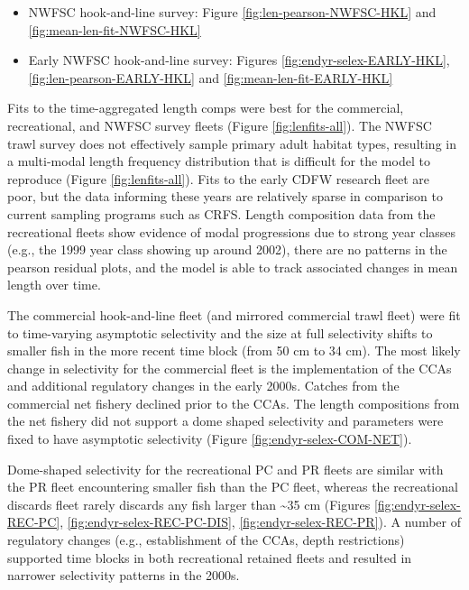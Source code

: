 \documentclass[11pt,
  english,
]{article}
\begin{document}
\begin{itemize}
  \tagmcend\tagstructend\tagstructend
\item

  NWFSC hook-and-line survey: Figure \ref{fig:len-pearson-NWFSC-HKL} and \ref{fig:mean-len-fit-NWFSC-HKL}

  \tagmcend\tagstructend\tagstructend
\item

  Early NWFSC hook-and-line survey: Figures \ref{fig:endyr-selex-EARLY-HKL}, \ref{fig:len-pearson-EARLY-HKL} and \ref{fig:mean-len-fit-EARLY-HKL}

  \tagmcend\tagstructend\tagstructend
\end{itemize}

\tagstructend

Fits to the time-aggregated length comps were best for the commercial, recreational, and NWFSC survey fleets (Figure \ref{fig:lenfits-all}). The NWFSC trawl survey does not effectively sample primary adult habitat types, resulting in a multi-modal length frequency distribution that is difficult for the model to reproduce (Figure \ref{fig:lenfits-all}). Fits to the early CDFW research fleet are poor, but the data informing these years are relatively sparse in comparison to current sampling programs such as CRFS. Length composition data from the recreational fleets show evidence of modal progressions due to strong year classes (e.g., the 1999 year class showing up around 2002), there are no patterns in the pearson residual plots, and the model is able to track associated changes in mean length over time.

The commercial hook-and-line fleet (and mirrored commercial trawl fleet) were fit to time-varying asymptotic selectivity and the size at full selectivity shifts to smaller fish in the more recent time block (from 50 cm to 34 cm). The most likely change in selectivity for the commercial fleet is the implementation of the CCAs and additional regulatory changes in the early 2000s. Catches from the commercial net fishery declined prior to the CCAs. The length compositions from the net fishery did not support a dome shaped selectivity and parameters were fixed to have asymptotic selectivity (Figure \ref{fig:endyr-selex-COM-NET}).

Dome-shaped selectivity for the recreational PC and PR fleets are similar with the PR fleet encountering smaller fish than the PC fleet, whereas the recreational discards fleet rarely discards any fish larger than \textasciitilde35 cm (Figures \ref{fig:endyr-selex-REC-PC}, \ref{fig:endyr-selex-REC-PC-DIS}, \ref{fig:endyr-selex-REC-PR}). A number of regulatory changes (e.g., establishment of the CCAs, depth restrictions) supported time blocks in both recreational retained fleets and resulted in narrower selectivity patterns in the 2000s.
\end{document}
